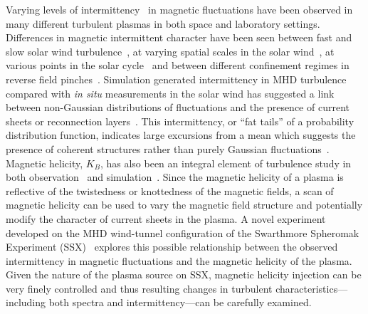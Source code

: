 \documentclass[aps,prl,amsmath,amssymb,reprint,superscriptaddress]{revtex4-1} %
\begin{document}
Varying levels of intermittency~\cite{frisch95} in magnetic fluctuations have been observed in many different turbulent plasmas in both space and laboratory settings. Differences in magnetic intermittent character have been seen between fast and slow solar wind turbulence~\cite{sorrisovalvo99}, at varying spatial scales in the solar wind~\cite{wan12}, at various points in the solar cycle~\cite{hnat07} and between different confinement regimes in reverse field pinches~\cite{sorrisovalvo01,marrelli05}. Simulation generated intermittency in MHD turbulence~\cite{Greco08,Greco09,Wan09,Servidio11b} compared with {\it in situ} measurements in the solar wind has suggested a link between non-Gaussian distributions of fluctuations and the presence of current sheets or reconnection layers~\cite{veltri99,carbone90}. This intermittency, or ``fat tails'' of a probability distribution function, indicates large excursions from a mean which suggests the presence of coherent structures rather than purely Gaussian fluctuations~\cite{Greco08}. Magnetic helicity, $K_{B}$, has also been an integral element of turbulence study in both observation~\cite{matthaeus82} and simulation~\cite{biskamp00,muller12}. Since the magnetic helicity of a plasma is reflective of the twistedness or knottedness of the magnetic fields, a scan of magnetic helicity can be used to vary the magnetic field structure and potentially modify the character of current sheets in the plasma. A novel experiment developed on the MHD wind-tunnel configuration of the Swarthmore Spheromak Experiment (SSX)~\cite{Gray13,schaffner14} explores this possible relationship between the observed intermittency in magnetic fluctuations and the magnetic helicity of the plasma. Given the nature of the plasma source on SSX, magnetic helicity injection can be very finely controlled and thus resulting changes in turbulent characteristics---including both spectra and intermittency---can be carefully examined.
\end{document}
